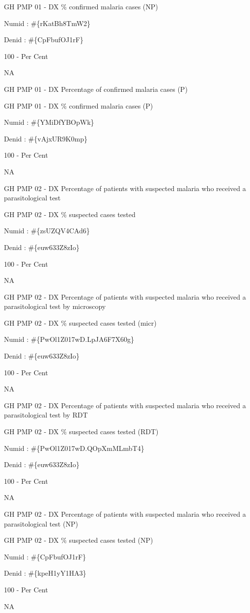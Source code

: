 \documentclass[]{book}
\begin{document}
GH PMP 01 - DX \% confirmed malaria cases (NP)

Numid : \#\{rKatBh8TmW2\}

Denid : \#\{CpFbufOJ1rF\}

100 - Per Cent

NA

GH PMP 01 - DX Percentage of confirmed malaria cases (P)

GH PMP 01 - DX \% confirmed malaria cases (P)

Numid : \#\{YMiDfYBOpWk\}

Denid : \#\{vAjxUR9K0mp\}

100 - Per Cent

NA

GH PMP 02 - DX Percentage of patients with suspected malaria who received a parasitological test

GH PMP 02 - DX \% suspected cases tested

Numid : \#\{zsUZQV4CAd6\}

Denid : \#\{euw633Z8zIo\}

100 - Per Cent

NA

GH PMP 02 - DX Percentage of patients with suspected malaria who received a parasitological test by microscopy

GH PMP 02 - DX \% suspected cases tested (micr)

Numid : \#\{PwOl1Z017wD.LpJA6F7X60g\}

Denid : \#\{euw633Z8zIo\}

100 - Per Cent

NA

GH PMP 02 - DX Percentage of patients with suspected malaria who received a parasitological test by RDT

GH PMP 02 - DX \% suspected cases tested (RDT)

Numid : \#\{PwOl1Z017wD.QOpXmMLmbT4\}

Denid : \#\{euw633Z8zIo\}

100 - Per Cent

NA

GH PMP 02 - DX Percentage of patients with suspected malaria who received a parasitological test (NP)

GH PMP 02 - DX \% suspected cases tested (NP)

Numid : \#\{CpFbufOJ1rF\}

Denid : \#\{kpeH1yY1HA3\}

100 - Per Cent

NA
\end{document}

